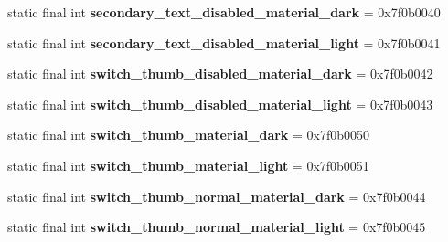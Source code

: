 \begin{DoxyCompactItemize}
\item 
\hypertarget{classandroid_1_1support_1_1v7_1_1appcompat_1_1_r_1_1color_a23fe3e162981d29924942c7b1bf05882}{}static final int {\bfseries secondary\+\_\+text\+\_\+disabled\+\_\+material\+\_\+dark} = 0x7f0b0040\label{classandroid_1_1support_1_1v7_1_1appcompat_1_1_r_1_1color_a23fe3e162981d29924942c7b1bf05882}

\item 
\hypertarget{classandroid_1_1support_1_1v7_1_1appcompat_1_1_r_1_1color_a8724fc74358a7718ea386065610dbc0c}{}static final int {\bfseries secondary\+\_\+text\+\_\+disabled\+\_\+material\+\_\+light} = 0x7f0b0041\label{classandroid_1_1support_1_1v7_1_1appcompat_1_1_r_1_1color_a8724fc74358a7718ea386065610dbc0c}

\item 
\hypertarget{classandroid_1_1support_1_1v7_1_1appcompat_1_1_r_1_1color_abcca137fe8d9969eee2d1398c08de973}{}static final int {\bfseries switch\+\_\+thumb\+\_\+disabled\+\_\+material\+\_\+dark} = 0x7f0b0042\label{classandroid_1_1support_1_1v7_1_1appcompat_1_1_r_1_1color_abcca137fe8d9969eee2d1398c08de973}

\item 
\hypertarget{classandroid_1_1support_1_1v7_1_1appcompat_1_1_r_1_1color_a489562997ece3fe0de5f8ab8e70813f2}{}static final int {\bfseries switch\+\_\+thumb\+\_\+disabled\+\_\+material\+\_\+light} = 0x7f0b0043\label{classandroid_1_1support_1_1v7_1_1appcompat_1_1_r_1_1color_a489562997ece3fe0de5f8ab8e70813f2}

\item 
\hypertarget{classandroid_1_1support_1_1v7_1_1appcompat_1_1_r_1_1color_ab3f5b30d869ad8079583dcb3ca70c48a}{}static final int {\bfseries switch\+\_\+thumb\+\_\+material\+\_\+dark} = 0x7f0b0050\label{classandroid_1_1support_1_1v7_1_1appcompat_1_1_r_1_1color_ab3f5b30d869ad8079583dcb3ca70c48a}

\item 
\hypertarget{classandroid_1_1support_1_1v7_1_1appcompat_1_1_r_1_1color_a7c510dd45c37c40591c33a8e683bba44}{}static final int {\bfseries switch\+\_\+thumb\+\_\+material\+\_\+light} = 0x7f0b0051\label{classandroid_1_1support_1_1v7_1_1appcompat_1_1_r_1_1color_a7c510dd45c37c40591c33a8e683bba44}

\item 
\hypertarget{classandroid_1_1support_1_1v7_1_1appcompat_1_1_r_1_1color_a6854a559785b1a0afe28f5a77b586c04}{}static final int {\bfseries switch\+\_\+thumb\+\_\+normal\+\_\+material\+\_\+dark} = 0x7f0b0044\label{classandroid_1_1support_1_1v7_1_1appcompat_1_1_r_1_1color_a6854a559785b1a0afe28f5a77b586c04}

\item 
\hypertarget{classandroid_1_1support_1_1v7_1_1appcompat_1_1_r_1_1color_a4b8ce6e9c94accbc194f64dc674513a0}{}static final int {\bfseries switch\+\_\+thumb\+\_\+normal\+\_\+material\+\_\+light} = 0x7f0b0045\label{classandroid_1_1support_1_1v7_1_1appcompat_1_1_r_1_1color_a4b8ce6e9c94accbc194f64dc674513a0}

\end{DoxyCompactItemize}


